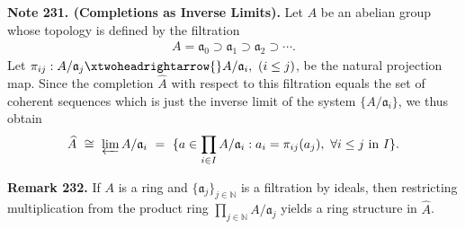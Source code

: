 \documentclass[12pt,a4paper,footinclude=true,headinclude=true]{scrbook} %
\newenvironment{remark}[2][Remark]
    { \begin{mdframed}[backgroundcolor=gray!20] \textbf{#1 #2.} }
    {  \end{mdframed}}
\newenvironment{nt}[2][Note]
    { \begin{mdframed}[backgroundcolor=gray!20] \textbf{#1 #2.} }
    {  \end{mdframed}}
\begin{document}
\begin{nt}{231. (Completions as Inverse Limits)}
    \newline Let $A$ be an abelian group whose topology is defined by the filtration
    \begin{align*}
        A=\mathfrak{a}_0\supset\mathfrak{a}_1\supset\mathfrak{a}_2\supset\cdots.
    \end{align*}
    Let $\pi_{ij}:A/\mathfrak{a}_j\xtwoheadrightarrow{} A/\mathfrak{a}_i,\ (i\leq j)$, be the natural projection map. Since the completion $\widehat{A}$ with respect to this filtration equals the set of coherent sequences which is just the inverse limit of the system $\{A/\mathfrak{a}_i\}$, we thus obtain
    \begin{align*}
        \widehat{A}\ \cong\ \varprojlim A/\mathfrak{a}_i\ =\ \{a\in\prod_{i\in I}A/\mathfrak{a}_i:a_i=\pi_{ij}(a_j),\ \forall i\leq j\ \text{in}\ I\}.
    \end{align*}
\end{nt}

\begin{remark}{232}
    If $A$ is a ring and $\{\mathfrak{a}_j\}_{j\in\mathbb{N}}$ is a filtration by ideals, then restricting multiplication from the product ring $\prod_{j\in\mathbb{N}}A/\mathfrak{a}_j$ yields a ring structure in $\widehat{A}$.
\end{remark}
\end{document}
